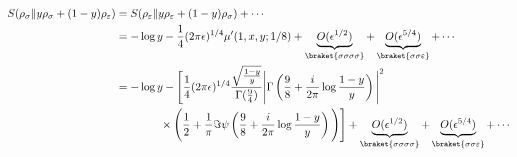 \documentclass[11pt]{article}
\newcommand{\ep}{\epsilon}
\newcommand{\nn}{\nonumber}
\newcommand{\lb}{\left(}
\newcommand{\rb}{\right)}
\begin{document}
\begin{align}
    S(\rho_\sigma \| y \rho_\sigma + (1-y)\rho_\varepsilon) &=S(\rho_\varepsilon \| y \rho_\varepsilon + (1-y)\rho_\sigma) +\cdots \\&= -\log y -  \frac{1}{4}(2\pi \ep)^{1/4} \mu'(1,x,y;1/8)+ \underbrace{O(\ep^{1/2})}_{\braket{\sigma\sigma\sigma\sigma}} +\underbrace{O(\ep^{5/4})}_{\braket{\sigma\sigma\varepsilon}} +\cdots\\
    &= -\log y  -\Bigg[ \frac{1}{4}(2\pi \ep)^{1/4}\frac{\sqrt\frac{1-y}{y}}{\Gamma(\frac{9}{4})}\Bigg| \Gamma\lb \frac{9}{8} + \frac{i}{2\pi}\log \frac{1-y}{y}\rb \Bigg|^2 \nn\\
    &\qquad\qquad
    \times\Bigg( \frac{1}{2} + \frac{1}{\pi}\Im \psi \lb \frac{9}{8}+ \frac{i}{2\pi}\log \frac{1-y}{y}\rb\Bigg)\Bigg] + \underbrace{O(\ep^{1/2})}_{\braket{\sigma\sigma\sigma\sigma}} +\underbrace{O(\ep^{5/4})}_{\braket{\sigma\sigma\varepsilon}}+\cdots 
\end{align}
\end{document}
